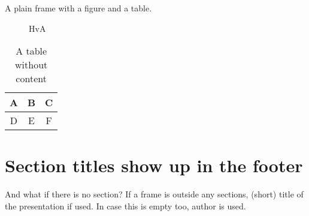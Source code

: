 \documentclass[pdf]{beamer}
\begin{document}
\begin{frame}[plain]

	A plain frame with a figure and a table.

	\vfill

	\begin{figure}
		\caption{HvA}\label{fig:hva-logo}
		\insertlogo
	\end{figure}
	
	\begin{table}
		\begin{tabular}{|c|c|c|}
			\hline
			A & B & C \\
			\hline
			D & E & F \\
			\hline
		\end{tabular}
		\caption{A table without content}\label{tab:nonsense}
	\end{table}
\end{frame}

\section{Section titles show up in the footer}

\begin{frame}{\insertsectionhead}
	\begin{alertblock}{And what if there is no section?}
		If a frame is outside any sections, (short) title of the presentation if used. In case this is empty too, author is used.
	\end{alertblock}
\end{frame}
\end{document}
